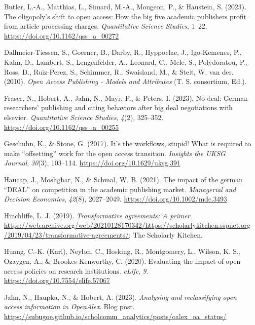 \documentclass[a4paper,man,floatsintext,longtable,noextraspace,12pt]{apa6}
\newenvironment{CSLReferences}%
  {}%
  {\par}
\begin{document}
\begin{CSLReferences}{1}{0}
\leavevmode{}%
Butler, L.-A., Matthias, L., Simard, M.-A., Mongeon, P., \& Haustein, S.
(2023). The oligopoly's shift to open access: How the big five academic
publishers profit from article processing charges. \emph{Quantitative
Science Studies}, 1--22. \url{https://doi.org/10.1162/qss_a_00272}

\leavevmode{}%
Dallmeier-Tiessen, S., Goerner, B., Darby, R., Hyppoelae, J.,
Igo-Kemenes, P., Kahn, D., Lambert, S., Lengenfelder, A., Leonard, C.,
Mele, S., Polydoratou, P., Ross, D., Ruiz-Perez, S., Schimmer, R.,
Swaisland, M., \& Stelt, W. van der. (2010). \emph{{Open Access
Publishing - Models and Attributes}} (T. S. consortium, Ed.).

\leavevmode{}%
Fraser, N., Hobert, A., Jahn, N., Mayr, P., \& Peters, I. (2023). No
deal: German researchers' publishing and citing behaviors after big deal
negotiations with elsevier. \emph{Quantitative Science Studies},
\emph{4}(2), 325--352. \url{https://doi.org/10.1162/qss_a_00255}

\leavevmode{}%
Geschuhn, K., \& Stone, G. (2017). It's the workflows, stupid! What is
required to make {``offsetting''} work for the open access transition.
\emph{Insights the {UKSG} Journal}, \emph{30}(3), 103--114.
\url{https://doi.org/10.1629/uksg.391}

\leavevmode{}%
Haucap, J., Moshgbar, N., \& Schmal, W. B. (2021). The impact of the
german {``DEAL''} on competition in the academic publishing market.
\emph{Managerial and Decision Economics}, \emph{42}(8), 2027--2049.
\url{https://doi.org/10.1002/mde.3493}

\leavevmode{}%
Hinchliffe, L. J. (2019). \emph{Transformative agreements: A primer}.
\url{https://web.archive.org/web/20210128170342/https://scholarlykitchen.sspnet.org/2019/04/23/transformative-agreements/};
The Scholarly Kitchen.

\leavevmode{}%
Huang, C.-K. (Karl), Neylon, C., Hosking, R., Montgomery, L., Wilson, K.
S., Ozaygen, A., \& Brookes-Kenworthy, C. (2020). Evaluating the impact
of open access policies on research institutions. \emph{{eLife}},
\emph{9}. \url{https://doi.org/10.7554/elife.57067}

\leavevmode{}%
Jahn, N., Haupka, N., \& Hobert, A. (2023). \emph{Analysing and
reclassifying open access information in OpenAlex}. Blog post.
\url{https://subugoe.github.io/scholcomm_analytics/posts/oalex_oa_status/}


\end{CSLReferences}
\end{document}
